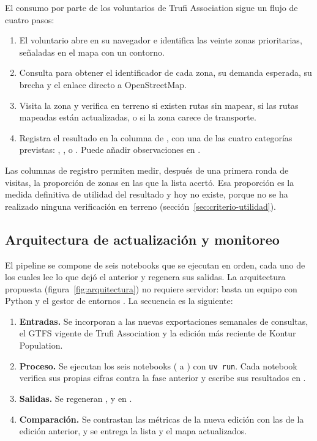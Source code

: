 El consumo por parte de los voluntarios de Trufi Association sigue un flujo de cuatro pasos:
\begin{enumerate}
  \item El voluntario abre  en su navegador e identifica las veinte
        zonas prioritarias, señaladas en el mapa con un contorno.
  \item Consulta  para obtener el identificador de cada zona, su
        demanda esperada, su brecha y el enlace directo a OpenStreetMap.
  \item Visita la zona y verifica en terreno si existen rutas sin mapear, si las rutas
        mapeadas están actualizadas, o si la zona carece de transporte.
  \item Registra el resultado en la columna  de
        , con una de las cuatro categorías previstas:
        , ,  o
        . Puede añadir observaciones en .
\end{enumerate}

Las columnas de registro permiten medir, después de una primera ronda de visitas, la
proporción de zonas en las que la lista acertó. Esa proporción es la medida definitiva de
utilidad del resultado y hoy no existe, porque no se ha realizado ninguna verificación en
terreno (sección~\ref{sec:criterio-utilidad}).

\subsection{Arquitectura de actualización y monitoreo}
\label{sec:monitoreo}

El pipeline se compone de seis notebooks que se ejecutan en orden, cada uno de los cuales
lee lo que dejó el anterior y regenera sus salidas. La arquitectura propuesta
(figura~\ref{fig:arquitectura}) no requiere servidor: basta un equipo con Python y el gestor
de entornos . La secuencia es la siguiente:
\begin{enumerate}
  \item \textbf{Entradas.} Se incorporan a  las nuevas exportaciones
        semanales de consultas, el GTFS vigente de Trufi Association y la edición más
        reciente de Kontur Population.
  \item \textbf{Proceso.} Se ejecutan los seis notebooks ( a
        ) con \texttt{uv run}. Cada notebook verifica sus propias cifras
        contra la fase anterior y escribe sus resultados en .
  \item \textbf{Salidas.} Se regeneran ,
         y  en
        .
  \item \textbf{Comparación.} Se contrastan las métricas de la nueva edición con las de la
        edición anterior, y se entrega la lista y el mapa actualizados.
\end{enumerate}

